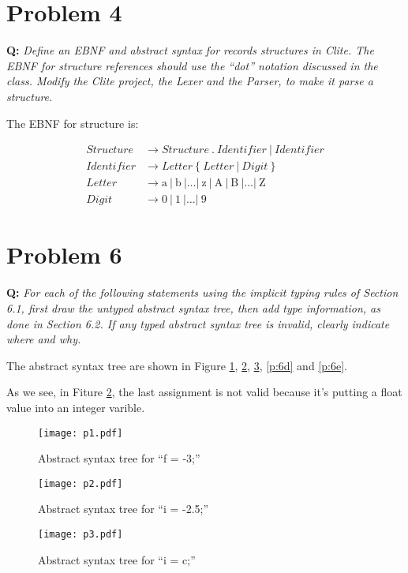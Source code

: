 \documentclass{article}
\begin{document}
\section*{Problem 4}
\textbf{Q:} \textit{Define an EBNF and abstract syntax for records structures in Clite. The EBNF for structure references should use the “dot” notation discussed in the class. Modify the Clite project, the Lexer and the Parser, to make it parse a structure.}

The EBNF for structure is:

\begin{align*}
Structure &\rightarrow Structure\ .\ Identifier\ |\ Identifier \\
Identifier &\rightarrow Letter\ \{\ Letter\ |\ Digit\ \} \\
Letter &\rightarrow \mathrm{a}\ |\ \mathrm{b}\ | \dots |\ \mathrm{z}\ |\ \mathrm{A}\ |\ \mathrm{B}\ | \dots |\ \mathrm{Z} \\
Digit &\rightarrow 0\ |\ 1\ | \dots |\ 9
\end{align*}

\section*{Problem 6}
\textbf{Q:} \textit{For each of the following statements using the implicit typing rules of Section 6.1, first draw the untyped abstract syntax tree, then add type information, as done in Section 6.2. If any typed abstract syntax tree is invalid, clearly indicate where and why.}

The abstract syntax tree are shown in Figure \ref{p:6a}, \ref{p:6b}, \ref{p:6c}, \ref{p:6d} and \ref{p:6e}.

As we see, in Fiture \ref{p:6b}, the last assignment is not valid because it's putting a float value into an integer varible.

\begin{figure}[hp]
\centering
\texttt{[image: p1.pdf]}
\caption{Abstract syntax tree for ``f = -3;''}
\label{p:6a}
\end{figure}

\begin{figure}[hp]
\centering
\texttt{[image: p2.pdf]}
\caption{Abstract syntax tree for ``i = -2.5;''}
\label{p:6b}
\end{figure}

\begin{figure}[hp]
\centering
\texttt{[image: p3.pdf]}
\caption{Abstract syntax tree for ``i = c;''}
\label{p:6c}
\end{figure}
\end{document}
